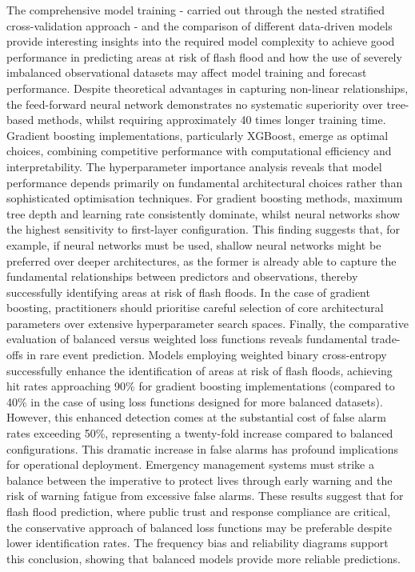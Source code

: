 \documentclass[nhess, manuscript]{copernicus}
\begin{document}
The comprehensive model training - carried out through the nested stratified cross-validation approach - and the comparison of different data-driven models provide interesting insights into the required model complexity to achieve good performance in predicting areas at risk of flash flood and how the use of severely imbalanced observational datasets may affect model training and forecast performance. Despite theoretical advantages in capturing non-linear relationships, the feed-forward neural network demonstrates no systematic superiority over tree-based methods, whilst requiring approximately 40 times longer training time. Gradient boosting implementations, particularly XGBoost, emerge as optimal choices, combining competitive performance with computational efficiency and interpretability. The hyperparameter importance analysis reveals that model performance depends primarily on fundamental architectural choices rather than sophisticated optimisation techniques. For gradient boosting methods, maximum tree depth and learning rate consistently dominate, whilst neural networks show the highest sensitivity to first-layer configuration. This finding suggests that, for example, if neural networks must be used, shallow neural networks might be preferred over deeper architectures, as the former is already able to capture the fundamental relationships between predictors and observations, thereby successfully identifying areas at risk of flash floods. In the case of gradient boosting, practitioners should prioritise careful selection of core architectural parameters over extensive hyperparameter search spaces. Finally, the comparative evaluation of balanced versus weighted loss functions reveals fundamental trade-offs in rare event prediction. Models employing weighted binary cross-entropy successfully enhance the identification of areas at risk of flash floods, achieving hit rates approaching 90\% for gradient boosting implementations (compared to 40\% in the case of using loss functions designed for more balanced datasets). However, this enhanced detection comes at the substantial cost of false alarm rates exceeding 50\%, representing a twenty-fold increase compared to balanced configurations. This dramatic increase in false alarms has profound implications for operational deployment. Emergency management systems must strike a balance between the imperative to protect lives through early warning and the risk of warning fatigue from excessive false alarms. These results suggest that for flash flood prediction, where public trust and response compliance are critical, the conservative approach of balanced loss functions may be preferable despite lower identification rates. The frequency bias and reliability diagrams support this conclusion, showing that balanced models provide more reliable predictions.
\end{document}
